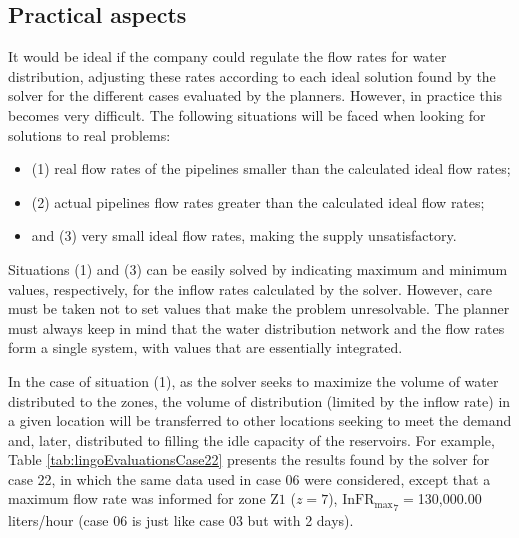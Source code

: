\documentclass{singlecol}
\theoremstyle{TH}{
\newtheorem{lemma}{Lemma}
\newtheorem{theorem}[lemma]{Theorem}
\newtheorem{corrolary}[lemma]{Corrolary}
\newtheorem{conjecture}[lemma]{Conjecture}
\newtheorem{proposition}[lemma]{Proposition}
\newtheorem{claim}[lemma]{Claim}
\newtheorem{stheorem}[lemma]{Wrong Theorem}
\newtheorem{algorithm}{Algorithm}
}
\theoremstyle{THrm}{
\newtheorem{definition}{Definition}[section]
\newtheorem{question}{Question}[section]
\newtheorem{remark}{Remark}
\newtheorem{scheme}{Scheme}
}
\theoremstyle{THhit}{
\newtheorem{case}{Case}[section]
}
\begin{document}
\subsection{Practical aspects}
\label{sec:praticalAspects}

It would be ideal if the company could regulate the flow rates for water distribution, adjusting these rates according to each ideal solution found by the solver for the different cases evaluated by the planners. However, in practice this becomes very difficult. The following situations will be faced when looking for solutions to real problems:

\begin{itemize}
\item (1) real flow rates of the pipelines smaller than the calculated ideal flow rates;
\item (2) actual pipelines flow rates greater than the calculated ideal flow rates;
\item and (3) very small ideal flow rates, making the supply unsatisfactory.
\end{itemize}

Situations (1) and (3) can be easily solved by indicating maximum and minimum values, respectively, for the inflow rates calculated by the solver. However, care must be taken not to set values that make the problem unresolvable. The planner must always keep in mind that the water distribution network and the flow rates form a single system, with values that are essentially integrated.

In the case of situation (1), as the solver seeks to maximize the volume of water distributed to the zones, the volume of distribution (limited by the inflow rate) in a given location will be transferred to other locations seeking to meet the demand and, later, distributed to filling the idle capacity of the reservoirs. For example, Table \ref{tab:lingoEvaluationsCase22} presents the results found by the solver for case 22, in which the same data used in case 06 were considered, except that a maximum flow rate was informed for zone $\mathrm{Z1}$ ($z = 7$), $\mathrm{InFR_{max}}_7 = $130,000.00 liters/hour (case 06 is just like case 03 but with 2 days).
\end{document}
